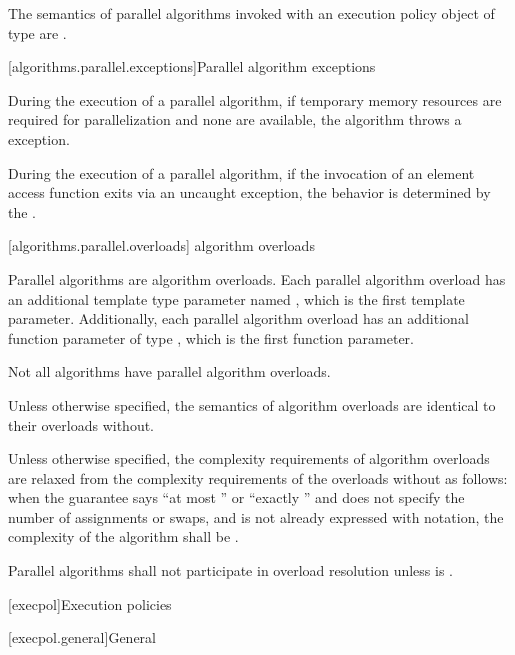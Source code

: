 \pnum
The semantics of parallel algorithms invoked with an execution policy object of
 type
are .

[algorithms.parallel.exceptions]{Parallel algorithm exceptions}

\pnum
During the execution of a parallel algorithm,
if temporary memory resources are required for parallelization
and none are available, the algorithm throws a  exception.

\pnum
During the execution of a parallel algorithm,
if the invocation of an element access function exits via an uncaught exception,
the behavior is determined by the .

[algorithms.parallel.overloads]{ algorithm overloads}

\pnum
Parallel algorithms are algorithm overloads.
Each parallel algorithm overload
has an additional template type parameter named ,
which is the first template parameter.
Additionally, each parallel algorithm overload
has an additional function parameter of type ,
which is the first function parameter.
\begin{note}
Not all algorithms have parallel algorithm overloads.
\end{note}

\pnum
Unless otherwise specified,
the semantics of  algorithm overloads
are identical to their overloads without.

\pnum
Unless otherwise specified,
the complexity requirements of  algorithm overloads
are relaxed from the complexity requirements of the overloads without
as follows:
when the guarantee says ``at most '' or
``exactly ''
and does not specify the number of assignments or swaps, and
 is not already expressed with \bigoh{} notation,
the complexity of the algorithm shall be .

\pnum
Parallel algorithms shall not participate in overload resolution unless
 is .

[execpol]{Execution policies}

[execpol.general]{General}

